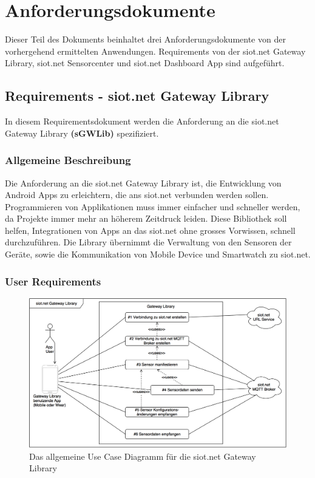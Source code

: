 \chapter{Anforderungsdokumente}
Dieser Teil des Dokuments beinhaltet drei Anforderungsdokumente von der vorhergehend ermittelten Anwendungen.
Requirements von der siot.net Gateway Library, siot.net Sensorcenter und siot.net Dashboard App sind aufgeführt.
\section{Requirements - siot.net Gateway Library}
In diesem Requirementsdokument werden die Anforderung an die siot.net Gateway Library \textbf{(\gls{sGWLib})} spezifiziert.
\subsection{Allgemeine Beschreibung}
Die Anforderung an die siot.net Gateway Library ist, die Entwicklung von Android Apps zu erleichtern, die ans siot.net verbunden werden sollen.
Programmieren von Applikationen muss immer einfacher und schneller werden, da Projekte immer mehr an höherem Zeitdruck leiden. Diese Bibliothek soll helfen, Integrationen von Apps an das siot.net ohne grosses Vorwissen, schnell durchzuführen.
Die Library übernimmt die Verwaltung von den Sensoren der Geräte, sowie die Kommunikation von Mobile Device und Smartwatch zu siot.net.
\subsection{User Requirements}
\begin{figure}[h]
  \centering
  \includegraphics[scale=0.3]{98_Bilder/08_Requirements/UseCaseGatewayLibrary}
  \caption[Use Case siot.net Gateway Library]{Das allgemeine Use Case Diagramm für die siot.net Gateway Library}
\end{figure}


